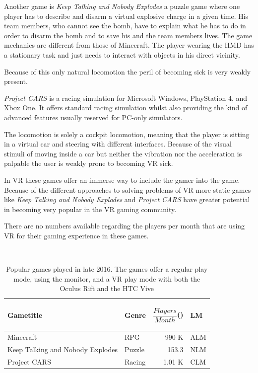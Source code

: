 Another game is \textit{Keep Talking and Nobody Explodes} a puzzle game where one player has to describe and disarm a virtual explosive charge in a given time. His team members, who cannot see the bomb, have to explain what he has to do in order to disarm the bomb and to save his and the team members lives. The game mechanics are different from those of Minecraft. The player wearing the HMD has a stationary task and just needs to interact with objects in his direct vicinity. 

Because of this only natural locomotion the peril of becoming sick is very weakly present.

\textit{Project CARS} is a racing simulation for Microsoft Windows, PlayStation 
4, and Xbox One. It offers standard racing simulation whilst also providing the 
kind of advanced features usually reserved for PC-only simulators.

The locomotion is solely a cockpit locomotion, meaning that the player is 
sitting in a virtual car and steering with different interfaces. Because of the 
visual stimuli of moving inside a car but neither the vibration nor the 
acceleration is palpable the user is weakly prone to becoming VR sick.

In VR these games offer an immerse way to include the gamer into the game. 
Because of the different approaches to solving problems of VR more static games 
like \textit{Keep Talking and Nobody Explodes} and \textit{Project CARS} have 
greater potential in becoming very popular in the VR gaming community. 

There are no numbers available regarding the players per month that are using 
VR for their gaming experience in these games. 


\begin{table}%
	\caption{Popular games played in late 2016. The games offer a regular play mode, using the monitor, and a VR play mode with both the Oculus Rift and the HTC Vive}~\label{tab:popularGames}
	
	\renewcommand{\arraystretch}{1.3}%
	\begin{tabular*}{\columnwidth}{ p{33mm} l r l }
		Gametitle & Genre & \parbox[c][2.2em][t]{2cm}{\begin{flushright}$\dfrac{Players}{Month}$(\footnotemark)\end{flushright}} & LM\footnotemark \\
		\hline
		Minecraft & RPG\footnotemark & 990 K & ALM \\
		Keep Talking and \newline Nobody Explodes & Puzzle & 153.3 & NLM \\
		Project CARS & Racing & 1.01 K & CLM\\
	\end{tabular*}
	
\end{table}

